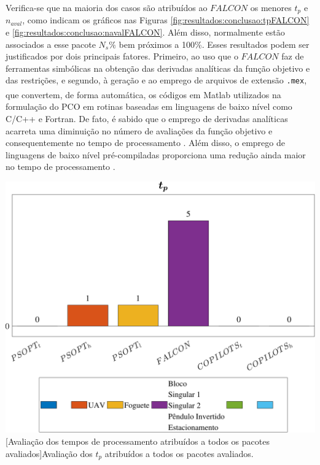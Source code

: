 
Verifica-se que na maioria dos casos são atribuídos ao $ FALCON $ os menores $ t_p $ e $ n_{aval} $, como indicam os gráficos nas Figuras \ref{fig:resultados:conclusao:tpFALCON} e \ref{fig:resultados:conclusao:navalFALCON}. Além disso, normalmente estão associados a esse pacote $ N_s\% $ bem próximos a 100\%. Esses resultados podem ser justificados por dois principais fatores. Primeiro, ao uso que o $ FALCON $ faz de ferramentas simbólicas na obtenção das derivadas analíticas da função objetivo e das restrições, e segundo, à geração e ao emprego de arquivos de extensão \texttt{.mex}, que convertem, de forma automática, os códigos em Matlab\textsuperscript{\textregistered} utilizados na formulação do PCO em rotinas baseadas em linguagens de baixo nível como C/C++ e Fortran. De fato, é sabido que o emprego de derivadas analíticas acarreta uma diminuição no número de avaliações da função objetivo e consequentemente no tempo de processamento \cite{betts_practical_2001}. Além disso, o emprego de linguagens de baixo nível pré-compiladas proporciona uma redução ainda maior no tempo de processamento \cite{febbo_nloptcontrol_2020}. 

\noindent	
\begin{minipage}{\textwidth}
	\vspace{\onelineskip}
	\centering
	\includegraphics[width=1\linewidth]{fig/resultados/ranking/all/t}
	[Avaliação dos tempos de processamento atribuídos a todos os pacotes avaliados]{Avaliação dos $t_p$ atribuídos a todos os pacotes avaliados.}
	\label{fig:resultados:conclusao:tpFALCON}
	\vspace{\onelineskip}
\end{minipage}

